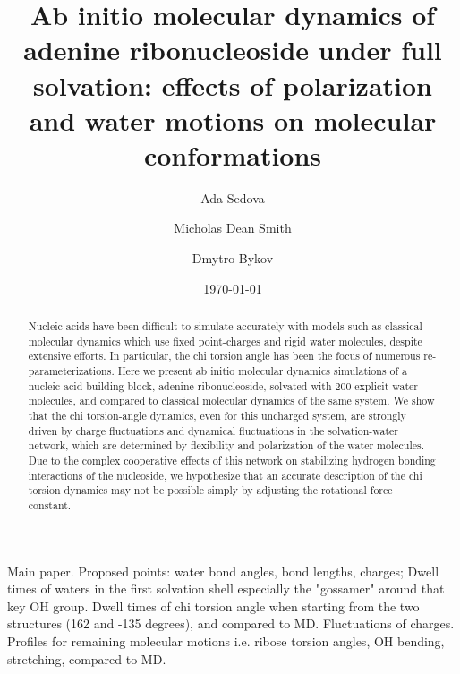 \documentclass[11pt]{article}
\begin{document}
 \title{\Large \textbf{{ Ab initio molecular dynamics of adenine ribonucleoside under full solvation: effects of polarization and water motions on molecular conformations}}}
\author[1]{Ada Sedova}
\author[2]{Micholas Dean Smith}
\author[1]{Dmytro Bykov}
\date{\today}
\maketitle
\begin{abstract}
Nucleic acids have been difficult to simulate accurately with models such as classical molecular dynamics which use fixed point-charges and rigid water molecules, despite extensive efforts. In particular, the chi torsion angle has been the focus of numerous re-parameterizations. Here we present ab initio molecular dynamics simulations of a nucleic acid building block, adenine ribonucleoside, solvated with 200 explicit water molecules, and compared to classical molecular dynamics of the same system. We show that the chi torsion-angle dynamics, even for this uncharged system, are strongly driven by charge fluctuations and dynamical fluctuations in the solvation-water network, which are determined by flexibility and polarization of the water molecules. Due to the complex cooperative effects of this network on stabilizing hydrogen bonding interactions of the nucleoside, we hypothesize that an accurate description of the chi torsion dynamics may not be possible simply by adjusting the rotational force constant.

\end{abstract}
Main paper. Proposed points: water bond angles, bond lengths, charges; Dwell times of waters in the first solvation shell especially the "gossamer" around that key OH group. Dwell times of chi torsion angle when starting from the two structures (162 and -135 degrees), and compared to MD. Fluctuations of charges. Profiles for remaining molecular motions i.e. ribose torsion angles, OH bending, stretching, compared to MD.
\end{document}
